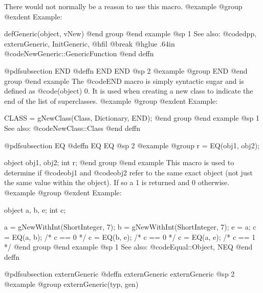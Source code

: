 {{{{There would not normally be a reason to use this macro.
@example
@group
@exdent Example:

defGeneric(object, vNew)
@end group
@end example
@sp 1
See also:  @code{dpp, externGeneric, InitGeneric,}
@hfil @break @hglue .64in      @code{NewGeneric::GenericFunction}
@end deffn



















@pdfsubsection {END}
@deffn {END} END
@sp 2
@example
@group
END
@end group
@end example
The @code{END} macro is simply syntactic sugar and is defined
as @code{(object) 0}.  It is used when creating a new class to
indicate the end of the list of superclasses.
@example
@group
@exdent Example:

CLASS = gNewClass(Class, Dictionary, END);
@end group
@end example
@sp 1
See also:  @code{NewClass::Class}
@end deffn














@pdfsubsection {EQ}
@deffn {EQ} EQ
@sp 2
@example
@group
r = EQ(obj1, obj2);

object  obj1, obj2;
int     r;
@end group
@end example
This macro is used to determine if @code{obj1} and @code{obj2} refer to
the same exact object (not just the same value within the object).  If
so a 1 is returned and 0 otherwise.
@example
@group
@exdent Example:

object  a, b, e;
int     c;

a = gNewWithInt(ShortInteger, 7);
b = gNewWithInt(ShortInteger, 7);
e = a;
c = EQ(a, b);   /* c == 0  */
c = EQ(b, e);   /* c == 0  */
c = EQ(a, e);   /* c == 1  */
@end group
@end example
@sp 1
See also:  @code{Equal::Object, NEQ}
@end deffn


















@pdfsubsection {externGeneric}
@deffn {externGeneric} externGeneric
@sp 2
@example
@group
externGeneric(typ, gen)

}}}}
